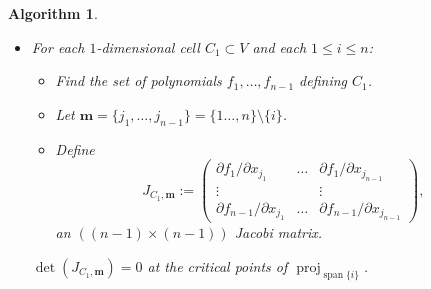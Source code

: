 \documentclass[
]{book}
\newtheorem{algorithm}{Algorithm}
\theoremstyle{definition}
\theoremstyle{definition}
\theoremstyle{definition}
\theoremstyle{definition}
\theoremstyle{remark}
\begin{document}
\begin{algorithm}
\begin{itemize}
  \begin{itemize}
  \item
    Find the set of polynomials \(f_1,\ldots,f_{n-2}\) defining \(C_2\) as described above.
  \item
    Let \(\mathbf{m} = \{j_1,\ldots,j_{n-2}\} = \{1\ldots,n\} \setminus \{i_1,i_2\}\).
  \item
    Define
    \begin{equation}
    J_{C_2,\mathbf{m}} :=
    \begin{pmatrix}\partial f_{1}/\partial x_{j_{1}} & \ldots & \partial f_{1}/\partial x_{j_{n-2}}\\
    \vdots &  & \vdots\\
    \partial f_{n-2}/\partial x_{j_{1}} & \ldots & \partial f_{n-2}/\partial x_{j_{n-2}}
    \end{pmatrix},
    \label{eq:jacobi-two}
    \end{equation}
    an \(((n-2)\times (n-2))\) Jacobi matrix.

    \(\det(J_{C_2,\mathbf{m}}) = 0\) at the critical points of \({\operatorname{proj}_{{\operatorname{span} \{i_1,i_2\}}}}\).
  \end{itemize}
\item
  For each \(1\)-dimensional cell \(C_1 \subset V\) and each \(1 \le i \le n\):

  \begin{itemize}
  \item
    Find the set of polynomials \(f_1,\ldots,f_{n-1}\) defining \(C_1\).
  \item
    Let \(\mathbf{m} = \{j_1,\ldots,j_{n-1}\} = \{1\ldots,n\} \setminus \{i\}\).
  \item
    Define
    \begin{equation}
    J_{C_1,\mathbf{m}} :=
    \begin{pmatrix}\partial f_{1}/\partial x_{j_{1}} & \ldots & \partial f_{1}/\partial x_{j_{n-1}}\\
    \vdots &  & \vdots\\
    \partial f_{n-1}/\partial x_{j_{1}} & \ldots & \partial f_{n-1}/\partial x_{j_{n-1}}
    \end{pmatrix},
    \label{eq:jacobi-one}
    \end{equation}
    an \(((n-1)\times (n-1))\) Jacobi matrix.
  \end{itemize}

  \(\det(J_{C_1,\mathbf{m}}) = 0\) at the critical points of \({\operatorname{proj}_{{\operatorname{span} \{i\}}}}\).


\end{itemize}
\end{algorithm}
\end{document}
